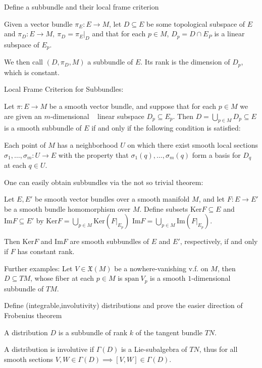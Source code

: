 Define a subbundle and their local frame criterion

Given a vector bundle \( \pi_{E} : E \to M \),
let \( D \subseteq E \) be some topological subspace of \( E \)
and \( \pi_{D} : E \to M,\ \pi_{D} = \pi_{E}|_{D}\)
and that for each \( p \in M \), \( D_p = D \cap E_P \)
is a linear subspace of \( E_p \).

We then call \( (D, \pi_{D}, M) \) a subbundle of \( E \).
Its rank is the dimension of \( D_p \), which is constant.

Local Frame Criterion for Subbundles:

Let \(\pi: E \rightarrow M\) be a smooth vector bundle, and suppose that for each \(p \in M\) we are given an \(m\)-dimensional   
linear subspace \(D_p \subseteq E_p\). 
Then \(D = \bigcup_{p \in M} D_p \subseteq E\) is a smooth subbundle of \(E\) if and only if the following condition is satisfied:

Each point of \(M\) has a neighborhood \(U\) on which there exist smooth local sections \(\sigma_1, \dots, \sigma_m: U \rightarrow E\) 
with the property that \(\sigma_1(q), \dots, \sigma_m(q)\) form a basis for \(D_q\) at each \(q \in U\).

One can easily obtain subbundles via the not so trivial theorem:

Let \(E, E'\) be smooth vector bundles over a smooth manifold \(M\), 
and let \(F: E \to E'\) be a smooth bundle homomorphism over \(M\). 
Define subsets \(\text{Ker} F \subseteq E\) and \(\text{Im} F \subseteq E'\) by
\(\text{Ker} F = \bigcup_{p \in M} \text{Ker} (F|_{E_p})\) 
\( \text{Im} F = \bigcup_{p \in M} \text{Im} (F|_{E_p}).\)

Then \(\text{Ker} F\) and \(\text{Im} F\) are smooth subbundles of \(E\) and \(E'\), 
respectively, if and only if \(F\) has constant rank.

Further examples:
Let \( V \in \mathfrak{X}(M) \) be a nowhere-vanishing v.f. on \( M \), then \( D \subseteq TM \),
whose fiber at each \( p \in M \) is \( \text{span}\ V_p \) is a smooth \( 1 \)-dimensional
subbundle of \( TM \).


Define (integrable,involutivity) distributions and 
prove the easier direction of Frobenius theorem

A distribution \( D \) is a subbundle of rank \( k \) of the tangent bundle \( TN \).

A distribution is involutive if \( \Gamma(D) \) is a Lie-subalgebra of \( TN \),
thus for all smooth sections \( V,W \in \Gamma(D) \implies [V, W] \in \Gamma(D)\).

